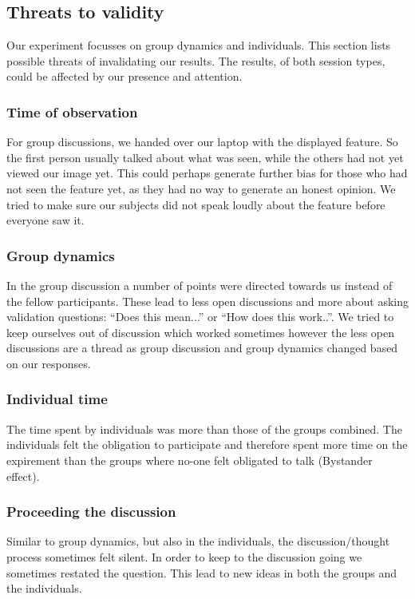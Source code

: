 \subsection{Threats to validity}
\label{threats}

Our experiment focusses on group dynamics and individuals. 
This section lists possible threats of invalidating our results. The results, of both session types, could be affected by our presence and attention.

\subsubsection{Time of observation}
For group discussions, we handed over our laptop with the displayed feature. So the first person usually talked about what was seen, while the others
had not yet viewed our image yet. This could perhaps generate further bias for those who had not seen the feature yet, as they had no way to generate an honest opinion. We tried to make sure our subjects did not speak loudly about the feature before everyone saw it. 

\subsubsection{Group dynamics}
In the group discussion a number of points were directed towards us instead of the fellow participants.
These lead to less open discussions and more about asking validation questions: ``Does this mean...'' or ``How does this work..''.
We tried to keep ourselves out of discussion which worked sometimes however the less open discussions are a thread as group discussion
and group dynamics changed based on our responses.

\subsubsection{Individual time}
The time spent by individuals was more than those of the groups combined. The individuals felt the obligation to participate
and therefore spent more time on the expirement than the groups where no-one felt obligated to talk (Bystander effect).

\subsubsection{Proceeding the discussion}
Similar to group dynamics, but also in the individuals, the discussion/thought process sometimes felt silent. In order to keep to the discussion
going we sometimes restated the question. This lead to new ideas in both the groups and the individuals.



